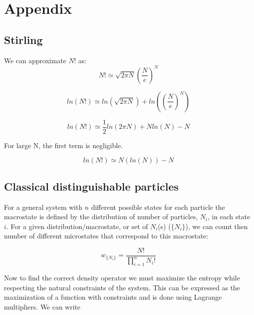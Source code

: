 \chapter{Appendix}\label{chp:appendix}

\section{Stirling}
We can approximate $N!$ as:
\begin{equation}
    N! \simeq \sqrt{2 \pi N} \left( \frac{N}{e} \right)^N
\end{equation}


\begin{equation}
    ln(N!) \simeq ln \left( \sqrt{2 \pi N} \right) + ln \left( \left( \frac{N}{e} \right)^N \right)
\end{equation}

\begin{equation}
    ln(N!) \simeq \frac{1}{2} ln(2 \pi N) + N ln(N) - N
\end{equation}

For large N, the first term is negligible.

\begin{equation}
    ln(N!) \simeq N \left( ln(N) \right) - N
\end{equation}








\section{Classical distinguishable particles}


For a general system with $n$ different possible states for each particle the macrostate is defined by the distribution of number of particles, $N_i$, in each state $i$. For a given distribution/macrostate, or set of $N_i$(s) ($\{N_i\}$), we can count then number of different microstates that correspond to this macrostate:


\begin{equation}
    w_{ \{ N_i\}} = \frac{N!}{\prod_{i=1}^{n} N_i!} 
    \label{Aeq:thermo_prob}
\end{equation} 

Now to find the correct density operator we must maximize the entropy while respecting the natural constraints of the system. 
This can be expressed as the maximization of a function with constraints and is done using Lagrange multipliers. We can write 

